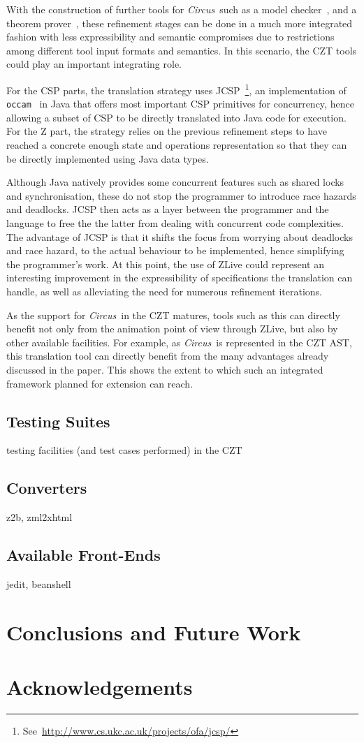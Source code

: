 \documentclass{llncs}
\newcommand{\Circus}{{\sf\slshape Circus}}
\begin{document}
With the construction of further tools for \Circus\ such as a model
checker~\cite{circus.mc:leo}, and a theorem
prover~\cite{circus.sem:pp}, these refinement stages can be done in a
much more integrated fashion with less expressibility and semantic
compromises due to restrictions among different tool input formats and
semantics.  In this scenario, the CZT tools could play an important
integrating role.

For the CSP parts, the translation strategy uses
JCSP~\footnote{See~\url{http://www.cs.ukc.ac.uk/projects/ofa/jcsp/}},
an implementation of \texttt{occam}~\cite{csp.tools:occam} in Java
that offers most important CSP primitives for concurrency, hence
allowing a subset of CSP to be directly translated into Java code for
execution.  For the Z part, the strategy relies on the previous
refinement steps to have reached a concrete enough state and
operations representation so that they can be directly implemented
using Java data types.

Although Java natively provides some concurrent features such as
shared locks and synchronisation, these do not stop the programmer to
introduce race hazards and deadlocks.  JCSP then acts as a layer
between the programmer and the language to free the the latter from
dealing with concurrent code complexities.  The advantage of JCSP is
that it shifts the focus from worrying about deadlocks and race
hazard, to the actual behaviour to be implemented, hence simplifying
the programmer's work.  At this point, the use of ZLive could
represent an interesting improvement in the expressibility of
specifications the translation can handle, as well as alleviating the
need for numerous refinement iterations.

As the support for \Circus\ in the CZT matures, tools such as this can
directly benefit not only from the animation point of view through
ZLive, but also by other available facilities.  For example, as
\Circus\ is represented in the CZT AST, this translation tool can
directly benefit from the many advantages already discussed in the
paper.  This shows the extent to which such an integrated framework
planned for extension can reach.

\subsection{Testing Suites}

testing facilities (and test cases performed) in the CZT

\subsection{Converters}

z2b, zml2xhtml

\subsection{Available Front-Ends}

jedit, beanshell

\section{Conclusions and Future Work} \label{sec:conclusions}

\section*{Acknowledgements}



\end{document}
